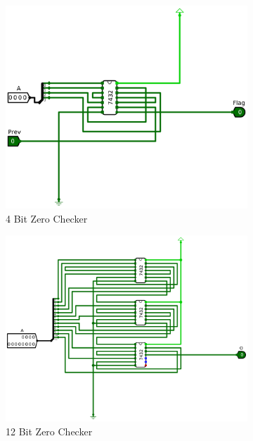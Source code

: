 \documentclass[12pt]{article}
\begin{document}
\begin{figure}[H]
    \centering
    \begin{subfigure}[b]{0.3\textwidth}
        \includegraphics[width=\textwidth]{Images/4Is0.png}
        \caption{4 Bit Zero Checker}
        \label{fig:4is0}
    \end{subfigure}
    \begin{subfigure}[b]{0.3\textwidth}
        \includegraphics[width=\textwidth]{Images/12Is0.png}
        \caption{12 Bit Zero Checker}
        \label{fig:12is0}
    \end{subfigure}
    \begin{subfigure}[b]{0.3\textwidth}

\end{subfigure}
\end{figure}
\end{document}
